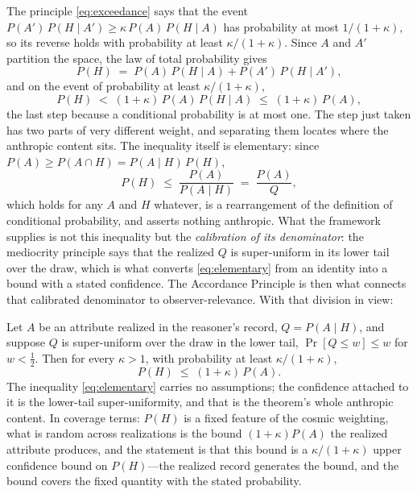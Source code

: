 The principle \eqref{eq:exceedance} says that the event $P(A')\,P(H \mid A') \ge \kappa\, P(A)\, P(H \mid A)$ has probability at most $1/(1+\kappa)$, so its reverse holds with probability at least $\kappa/(1+\kappa)$. Since $A$ and $A'$ partition the space, the law of total probability gives
\begin{equation}
\label{eq:total}
P(H) \;=\; P(A)\,P(H \mid A) + P(A')\,P(H \mid A'),
\end{equation}
and on the event of probability at least $\kappa/(1+\kappa)$,
\begin{equation}
\label{eq:bound-steps}
P(H) \;<\; (1+\kappa)\, P(A)\, P(H \mid A) \;\le\; (1+\kappa)\, P(A),
\end{equation}
the last step because a conditional probability is at most one.
The step just taken has two parts of very different weight, and separating them locates where the anthropic content sits. The inequality itself is elementary: since $P(A) \ge P(A \cap H) = P(A \mid H)\,P(H)$,
\begin{equation}
\label{eq:elementary}
P(H) \;\le\; \frac{P(A)}{P(A \mid H)} \;=\; \frac{P(A)}{Q},
\end{equation}
which holds for any $A$ and $H$ whatever, is a rearrangement of the definition of conditional probability, and asserts nothing anthropic. What the framework supplies is not this inequality but the \emph{calibration of its denominator}: the mediocrity principle says that the realized $Q$ is super-uniform in its lower tail over the draw, which is what converts \eqref{eq:elementary} from an identity into a bound with a stated confidence. The Accordance Principle is then what connects that calibrated denominator to observer-relevance. With that division in view:
\begin{theorem}
\label{thm:rarity}
Let $A$ be an attribute realized in the reasoner's record, $Q = P(A \mid H)$, and suppose $Q$ is super-uniform over the draw in the lower tail, $\Pr[Q \le w] \le w$ for $w < \tfrac12$. Then for every $\kappa > 1$, with probability at least $\kappa/(1+\kappa)$,
\begin{equation}
\label{eq:rarity}
P(H) \;\le\; (1+\kappa)\, P(A).
\end{equation}
The inequality \eqref{eq:elementary} carries no assumptions; the confidence attached to it is the lower-tail super-uniformity, and that is the theorem's whole anthropic content. In coverage terms: $P(H)$ is a fixed feature of the cosmic weighting, what is random across realizations is the bound $(1+\kappa)P(A)$ the realized attribute produces, and the statement is that this bound is a $\kappa/(1+\kappa)$ upper confidence bound on $P(H)$---the realized record generates the bound, and the bound covers the fixed quantity with the stated probability.
\end{theorem}

